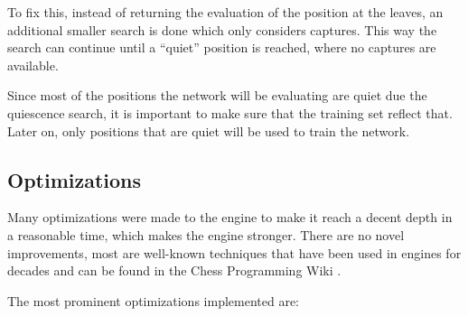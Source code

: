To fix this, instead of returning the evaluation of the position at the leaves, an additional smaller search is done which only considers captures. This way the search can continue until a \enquote{quiet} position is reached, where no captures are available.

Since most of the positions the network will be evaluating are quiet due the quiescence search, it is important to make sure that the training set reflect that. Later on, only positions that are quiet will be used to train the network.

\newpage
\subsection{Optimizations}

Many optimizations were made to the engine to make it reach a decent depth in a reasonable time, which makes the engine stronger. There are no novel improvements, most are well-known techniques that have been used in engines for decades and can be found in the Chess Programming Wiki \cite{cpw}.

The most prominent optimizations implemented are:

